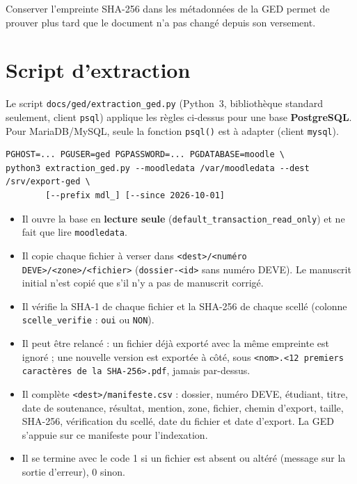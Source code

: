 \documentclass[11pt,a4paper]{article}
\begin{document}
Conserver l'empreinte SHA-256 dans les métadonnées de la GED permet de prouver plus tard que le
document n'a pas changé depuis son versement.

\section{Script d'extraction}\label{sec:script}

Le script \texttt{docs/ged/extraction\_ged.py} (Python~3, bibliothèque standard seulement, client
\texttt{psql}) applique les règles ci-dessus pour une base \textbf{PostgreSQL}. Pour MariaDB/MySQL,
seule la fonction \texttt{psql()} est à adapter (client \texttt{mysql}).

\begin{Verbatim}
PGHOST=... PGUSER=ged PGPASSWORD=... PGDATABASE=moodle \
python3 extraction_ged.py --moodledata /var/moodledata --dest /srv/export-ged \
        [--prefix mdl_] [--since 2026-10-01]
\end{Verbatim}

\begin{itemize}
  \item Il ouvre la base en \textbf{lecture seule} (\texttt{default\_transaction\_read\_only}) et ne
        fait que lire \texttt{moodledata}.
  \item Il copie chaque fichier à verser dans
        \texttt{<dest>/<numéro DEVE>/<zone>/<fichier>} (\texttt{dossier-<id>} sans numéro DEVE). Le
        manuscrit initial n'est copié que s'il n'y a pas de manuscrit corrigé.
  \item Il vérifie la SHA-1 de chaque fichier et la SHA-256 de chaque scellé (colonne
        \texttt{scelle\_verifie} : \texttt{oui} ou \texttt{NON}).
  \item Il peut être relancé : un fichier déjà exporté avec la même empreinte est ignoré ; une nouvelle
        version est exportée à côté, sous \texttt{<nom>.<12 premiers caractères de la SHA-256>.pdf},
        jamais par-dessus.
  \item Il complète \texttt{<dest>/manifeste.csv} : dossier, numéro DEVE, étudiant, titre, date de
        soutenance, résultat, mention, zone, fichier, chemin d'export, taille, SHA-256, vérification du
        scellé, date du fichier et date d'export. La GED s'appuie sur ce manifeste pour l'indexation.
  \item Il se termine avec le code 1 si un fichier est absent ou altéré (message sur la sortie
        d'erreur), 0 sinon.
\end{itemize}
\end{document}
